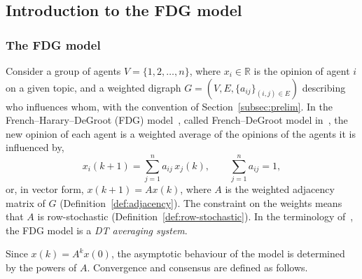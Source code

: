 \subsection{Introduction to the FDG model}
\label{subsec:fdg-intro}

\subsubsection{The FDG model}
\label{subsubsec:fdg-model}

Consider a group of agents $V = \{1, 2, \dots, n\}$, where $x_i \in \mathbb{R}$ is the
opinion of agent $i$ on a given topic, and a weighted digraph
$G = (V, E, \{a_{ij}\}_{(i,j) \in E})$ describing who influences whom, with the
convention of Section~\ref{subsec:prelim}. In the
French--Harary--DeGroot (FDG) model~\cite{baggio_dt}, called French--DeGroot model
in~\cite{proskurnikov2017tutorial}, the new opinion of each agent is a weighted average
of the opinions of the agents it is influenced by,
%
\begin{equation}\label{eq:fdg}
  x_i(k+1) = \sum_{j=1}^{n} a_{ij}\, x_j(k), \qquad \sum_{j=1}^{n} a_{ij} = 1,
\end{equation}
or, in vector form, $x(k+1) = A x(k)$, where $A$ is the weighted adjacency matrix
of $G$ (Definition~\ref{def:adjacency}). The constraint on the weights means that
$A$ is row-stochastic (Definition~\ref{def:row-stochastic}). In the terminology
of~\cite{baggio_dt}, the FDG model is a \emph{DT averaging system}.

Since $x(k) = A^k x(0)$, the asymptotic behaviour of the model is determined by the
powers of $A$. Convergence and consensus are defined as follows.

